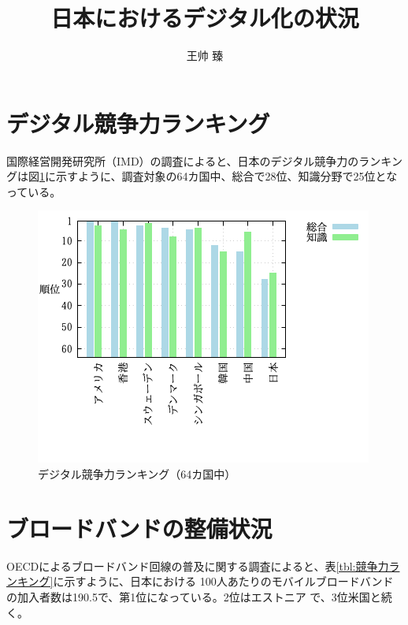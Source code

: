 \documentclass[a4paper,11pt,dvipdfmx]{ujarticle}
\title{日本におけるデジタル化の状況}
\author{王帅 臻 }
\begin{document}
\maketitle

\section{デジタル競争力ランキング}

国際経営開発研究所（IMD）の調査\cite{imd}によると、日本のデジタル競争力のランキングは図\ref{fig:imd_ranking}に示すように、調査対象の64カ国中、総合で28位、知識分野で25位となっている。

\begin{figure}[htbp]
\centering
\includegraphics[width=0.88\linewidth]{fig31.png}
\caption{デジタル競争力ランキング（64カ国中）}
\label{fig:imd_ranking}
\end{figure}
\newpage
\section{ブロードバンドの整備状況}

OECDによるブロードバンド回線の普及に関する調査\cite{oecd}によると、表\ref{tbl:競争力ランキング}に示すように、日本における 100人あたりのモバイルブロードバンドの加入者数は190.5で、第1位になっている。2位はエストニア
で、3位米国と続く。
\end{document}
